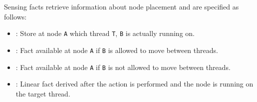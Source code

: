 Sensing facts retrieve information about node placement and are specified as
follows:

\begin{itemize}

   \item {}: Store at node \texttt{A} which
      thread \texttt{T}, \texttt{B} is actually running on.

   \item {}: Fact available at node \texttt{A} if
      \texttt{B} is allowed to move between threads.

   \item {}: Fact available at node \texttt{A} if
      \texttt{B} is not allowed to move between threads.

   \item {}: Linear fact derived after the 
      action is performed and the node is running on the target thread.

\end{itemize}

